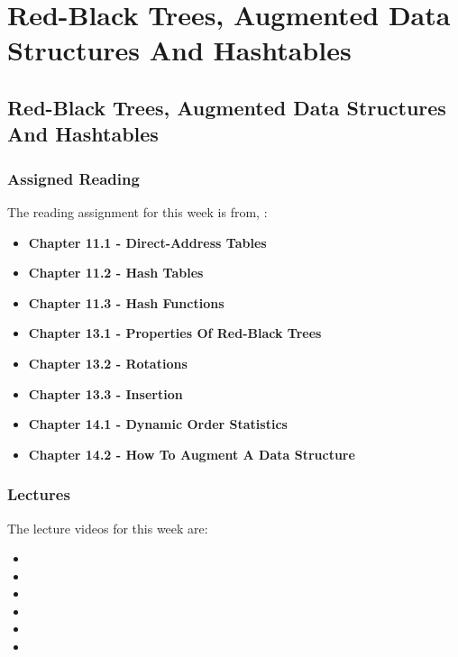 \clearpage

\renewcommand{\ChapTitle}{Red-Black Trees, Augmented Data Structures And Hashtables}
\renewcommand{\SectionTitle}{Red-Black Trees, Augmented Data Structures And Hashtables}

\chapter{\ChapTitle}
\section{\SectionTitle}

\subsection{Assigned Reading}

The reading assignment for this week is from, \Textbook:

\begin{itemize}
    \item \textbf{Chapter 11.1 - Direct-Address Tables}
    \item \textbf{Chapter 11.2 - Hash Tables}
    \item \textbf{Chapter 11.3 - Hash Functions}
    \item \textbf{Chapter 13.1 - Properties Of Red-Black Trees}
    \item \textbf{Chapter 13.2 - Rotations}
    \item \textbf{Chapter 13.3 - Insertion}
    \item \textbf{Chapter 14.1 - Dynamic Order Statistics}
    \item \textbf{Chapter 14.2 - How To Augment A Data Structure}
\end{itemize}

\subsection{Lectures}

The lecture videos for this week are:

\begin{itemize}
    \item {}
    \item {}
    \item {}
    \item {}
    \item {}
    \item {}
\end{itemize}

